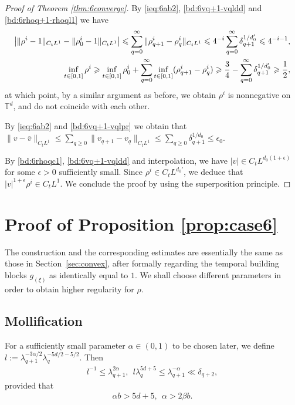 \documentclass[UTF-8,reqno]{amsart}
\numberwithin{equation}{section}
\theoremstyle{definition}
\def\geq{\geqslant}
\def\leq{\leqslant}
\def\geq{\geqslant}
\def\leq{\leqslant}
\begin{document}
\begin{proof}[Proof of Theorem \ref{thm:6converge}]
 By \eqref{ieq:6ab2}, \eqref{bd:6vq+1-vqldd} and \eqref{bd:6rhoq+1-rhoql1} we have
\begin{align} 
 \left|   \|\rho^i-1\|_{C_tL^1}- \| \rho^{i}_0-1\|_{C_tL^1}\right|\leq \sum_{q=0}^\infty\|\rho^{i}_{q+1}-\rho^{i}_{q}\|_{C_tL^1}\leq
4^{-i}\sum_{q=0}^\infty\delta_{q+1}^{1/{d_0'}}\leq 4^{-i-1},\\
\inf_{t\in [0,1]}\rho^i \geq \inf_{t\in [0,1]} \rho_0^i +
\sum_{q=0}^\infty \inf_{t\in [0,1]}(\rho_{q+1}^i- \rho_q^i) \geq\frac34-\sum_{q=0}^\infty \delta_{q+1}^{1/d_0'}\geq \frac12,\notag
\end{align}
at which point, by a similar argument as before,  we obtain 
 $\rho^{i}$ is nonnegative on $\mathbb{T}^d$, and do not coincide with each other. 

By \eqref{ieq:6ab2} and \eqref{bd:6vq+1-vqlpr} we obtain that $ \|v -\overline v \|_{C_tL^1}\leq  \sum_{q\geq0} \|v_{q+1}-v_q\|_{C_tL^1}\leq
\sum_{q\geq0}\delta_{q+1}^{1/d_0}\leq\epsilon_0.$ 

    By \eqref{bd:6rhoqc1}, \eqref{bd:6vq+1-vqldd} and interpolation, we have $|v| \in C_tL^{d_0(1+\epsilon)}$ for some $\epsilon > 0$ sufficiently small. Since $\rho^i \in C_tL^{d_0'}$, we deduce that $|v|^{1+\epsilon} \rho^i \in C_tL^{1}$. We conclude the proof by using the superposition principle.
\end{proof}
 

\section{Proof of Proposition \ref{prop:case6}}\label{sec:6convex}

The construction and the corresponding estimates are essentially the same as those in Section~\ref{sec:convex}, after formally regarding the temporal building blocks $g_{(\xi)}$ as identically equal to $1$.
 We shall choose different parameters in order to obtain higher regularity for $\rho$.


\subsection{Mollification}
For a sufficiently small parameter $\alpha\in(0,1)$ to be chosen later, we define
$
l:=\lambda_{q+1}^{-3\alpha/2}\lambda_q^{-5d/2-5/2}.
$
Then
\begin{align}
l^{-1}
\leq
\lambda_{q+1}^{2\alpha},
 \ \
l\lambda_q^{5d+5}
\leq
\lambda_{q+1}^{-\alpha} 
\ll
\delta_{q+2},
\label{para62}
\end{align}
provided that
\begin{align}
\alpha b>5d+5,
\ \
\alpha>2\beta b.
\label{alphab>6}
\end{align}
\end{document}
